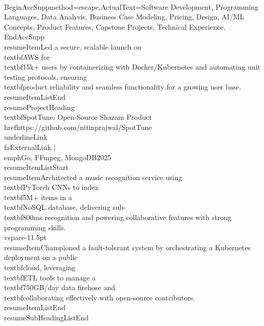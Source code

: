\documentclass[a4paper]{extarticle}
\makeatletter
\renewcommand\normalsize{\fontsize{10}{11.8}\selectfont}
\newcommand{\resumeItem}[1]{
  \item\normalsize{
    {#1 \vspace{-2pt}}
  }
}
\newcommand{\resumeProjectHeading}[2]{
    \item
    \begin{tabular*}{0.97\textwidth}{l@{\extracolsep{\fill}}r}
      \small#1 & \textbf{\small #2}\
    \end{tabular*}\vspace{-7pt}
}
\newcommand{\resumeSubHeadingListEnd}{\end{itemize}}
\newcommand{\resumeItemListStart}{\begin{itemize}}
\newcommand{\resumeItemListEnd}{\end{itemize}\vspace{-5pt}}
\makeatother
\begin{document}
{{{{{{{{{{        \\BeginAccSupp{method=escape,ActualText={Software Development, Programming Languages, Data Analysis, Business Case Modeling, Pricing, Design, AI/ML Concepts, Product Features, Capstone Projects, Technical Experience.}}\hspace{0pt}\\EndAccSupp{}
        \\resumeItem{Led a secure, scalable launch on \\textbf{AWS} for \\textbf{15k+} users by containerizing with Docker/Kubernetes and automating unit testing protocols, ensuring \\textbf{product reliability} and seamless functionality for a growing user base.}
    \\resumeItemListEnd
    \\resumeProjectHeading
    {\\textbf{SpotTune: Open-Source Shazam Product} {\\href{https://github.com/nitinprajwal/SpotTune}{\\underline{Link \\faExternalLink}}} $|$ \\emph{Go, FFmpeg, MongoDB}}{2025}
    \\resumeItemListStart
        \\resumeItem{Architected a music recognition service using \\textbf{PyTorch} CNNs to index \\textbf{5M+} items in a \\textbf{NoSQL} database, delivering sub-\\textbf{800ms} recognition and powering collaborative features with strong programming skills.}
        \\vspace{-11.5pt}
        \\resumeItem{Championed a fault-tolerant system by orchestrating a Kubernetes deployment on a public \\textbf{cloud}, leveraging \\textbf{ETL} tools to manage a \\textbf{750GB/day} data firehose and \\textbf{collaborating} effectively with open-source contributors.}
    \\resumeItemListEnd
\\resumeSubHeadingListEnd

}}}}}}}}}}
\end{document}
